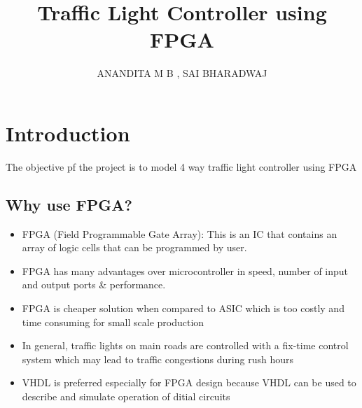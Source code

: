 \documentclass[11pt, a4paper]{article} %
\title{Traffic Light Controller using FPGA} %
\author{
ANANDITA M B , SAI BHARADWAJ %
  }
\begin{document}
%

\maketitle %

\begin{center} %
\end{center}

\setcounter{page}{1} %

\section{Introduction} %

The objective pf the project is to model 4 way traffic light controller using FPGA
\subsection{Why use FPGA?} %
  \begin{itemize}
  \item { FPGA (Field Programmable Gate Array): This is an IC that contains an array of logic cells that can be programmed by user.}
  \item { FPGA has many advantages over microcontroller in speed, number of input and output ports \& performance.}
  \item{FPGA is cheaper solution when compared to ASIC which is too costly and time consuming for small scale production}
  \item{In general, traffic lights on main roads are controlled with a fix-time control system which may lead to traffic congestions during rush hours}
  \item{VHDL is preferred especially for FPGA design because VHDL can be used to describe and simulate operation of ditial circuits}
  \end{itemize}
  
\end{document}
